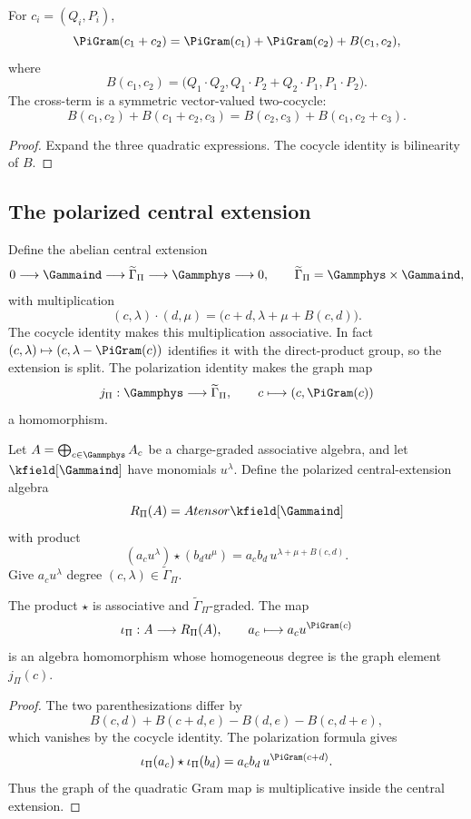 \begin{proposition}
For $c_i=(Q_i,P_i)$,
\[
 \PiGram(c_1+c_2)=\PiGram(c_1)+\PiGram(c_2)+B(c_1,c_2),
\]
where
\[
 B(c_1,c_2)=
 \bigl(Q_1\cdot Q_2,
 Q_1\cdot P_2+Q_2\cdot P_1,
 P_1\cdot P_2\bigr).
\]
The cross-term is a symmetric vector-valued two-cocycle:
\[
 B(c_1,c_2)+B(c_1+c_2,c_3)
 =B(c_2,c_3)+B(c_1,c_2+c_3).
\]
\end{proposition}
\begin{proof}
Expand the three quadratic expressions. The cocycle identity is bilinearity of $B$.
\end{proof}

\subsection{The polarized central extension}
Define the abelian central extension
\[
 0\longrightarrow\Gammaind\longrightarrow
 \widetilde\Gamma_\Pi
 \longrightarrow\Gammphys\longrightarrow0,
 \qquad
 \widetilde\Gamma_\Pi=\Gammphys\times\Gammaind,
\]
with multiplication
\[
 (c,\lambda)\cdot(d,\mu)
 =\bigl(c+d,\lambda+\mu+B(c,d)\bigr).
\]
The cocycle identity makes this multiplication associative. In fact
$(c,\lambda)\mapsto(c,\lambda-\PiGram(c))$ identifies it with
the direct-product group, so the extension is split. The
polarization identity makes the graph map
\[
 j_\Pi:\Gammphys\longrightarrow\widetilde\Gamma_\Pi,
 \qquad c\longmapsto(c,\PiGram(c))
\]
a homomorphism.

Let $A=\bigoplus_{c\in\Gammphys}A_c$ be a charge-graded associative algebra, and let $\kfield[\Gammaind]$ have monomials $u^\lambda$. Define the polarized central-extension algebra
\[
 \mathcal R_\Pi(A)=A\tensor\kfield[\Gammaind]
\]
with product
\[
 (a_cu^\lambda)\star(b_du^\mu)
 =a_cb_d\,u^{\lambda+\mu+B(c,d)}.
\]
Give $a_cu^\lambda$ degree $(c,\lambda)\in\widetilde\Gamma_\Pi$.

\begin{theorem}
The product $\star$ is associative and $\widetilde\Gamma_\Pi$-graded. The map
\[
 \iota_\Pi:A\longrightarrow\mathcal R_\Pi(A),
 \qquad a_c\longmapsto a_cu^{\PiGram(c)}
\]
is an algebra homomorphism whose homogeneous degree is the graph element $j_\Pi(c)$.
\end{theorem}
\begin{proof}
The two parenthesizations differ by
\[
 B(c,d)+B(c+d,e)-B(d,e)-B(c,d+e),
\]
which vanishes by the cocycle identity. The polarization formula gives
\[
 \iota_\Pi(a_c)\star\iota_\Pi(b_d)
 =a_cb_d\,u^{\PiGram(c+d)}.
\]
Thus the graph of the quadratic Gram map is multiplicative inside the central extension.
\end{proof}

